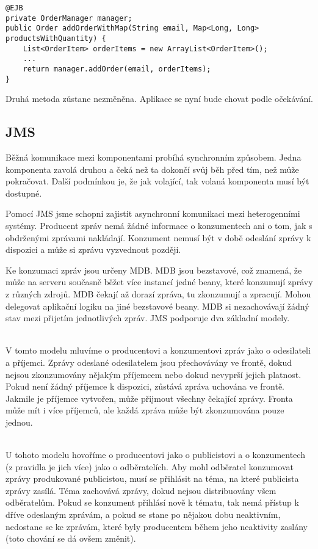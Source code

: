 \documentclass[122pt,oneside]{fithesis}
\begin{document}
\begin{lstlisting}
@EJB
private OrderManager manager;
public Order addOrderWithMap(String email, Map<Long, Long> productsWithQuantity) {
	List<OrderItem> orderItems = new ArrayList<OrderItem>();
	...
	return manager.addOrder(email, orderItems);
}
\end{lstlisting}

Druhá metoda zůstane nezměněna. Aplikace se nyní bude chovat podle očekávání.


\subsection{JMS}
Běžná komunikace mezi komponentami probíhá synchronním způsobem. Jedna komponenta zavolá druhou a čeká než ta dokončí svůj běh před tím, než může pokračovat. Další podmínkou je, že jak volající, tak volaná komponenta musí být dostupné.

Pomocí JMS jsme schopni zajistit asynchronní komunikaci mezi heterogenními systémy. Producent zpráv nemá žádné informace o konzumentech ani o tom, jak s obdrženými zprávami nakládají. Konzument nemusí být v době odeslání zprávy k dispozici a může si zprávu vyzvednout později.

Ke konzumaci zpráv jsou určeny MDB. MDB jsou bezstavové, což znamená, že může na serveru současně běžet více instancí jedné beany, které konzumují zprávy z různých zdrojů. MDB čekají až dorazí zpráva, tu zkonzumují a zpracují. Mohou delegovat aplikační logiku na jiné bezstavové beany. MDB si nezachovávají žádný stav mezi přijetím jednotlivých zpráv.
JMS podporuje dva základní modely.

\vspace{5 mm}
\\\indent V tomto modelu mluvíme o producentovi a konzumentovi zpráv jako o odesilateli a příjemci. Zprávy odeslané odesilatelem jsou přechovávány ve frontě, dokud nejsou zkonzumovány nějakým příjemcem nebo dokud nevyprší jejich platnost. Pokud není žádný příjemce k dispozici, zůstává zpráva uchována ve frontě. Jakmile je příjemce vytvořen, může přijmout všechny čekající zprávy. Fronta může mít i více příjemců, ale každá zpráva může být zkonzumována pouze jednou.

\vspace{5 mm}
\\\indent U tohoto modelu hovoříme o producentovi jako o publicistovi a o konzumentech (z pravidla je jich více) jako o odběratelích. Aby mohl odběratel konzumovat zprávy produkované publicistou, musí se přihlásit na téma, na které publicista zprávy zasílá. Téma zachovává zprávy, dokud nejsou distribuovány všem odběratelům. Pokud se konzument přihlásí nově k tématu, tak nemá přístup k dříve odeslaným zprávám, a pokud se stane po nějakou dobu neaktivním, nedostane se ke zprávám, které byly producentem během jeho neaktivity zaslány (toto chování se dá ovšem změnit).
\end{document}
